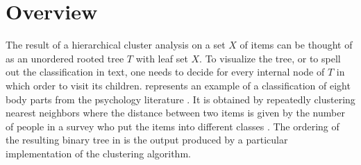 
%
%
%



\section{Overview}
\label{sec:overview}

The result of a hierarchical cluster analysis on a set $X$ of items can be thought of as an unordered rooted tree $T$ with leaf set $X$. To visualize the tree, or to spell out the classification in text, one needs to decide for every internal node of $T$ in which order to visit its children.  represents an example of a classification of eight body parts from the psychology literature \cite{Degerman1982}. It is obtained by repeatedly clustering nearest neighbors where the distance between two items is given by the number of people in a survey who put the items into different classes \cite{Miller1969}. The ordering of the resulting binary tree in  is the output produced by a particular implementation of the clustering algorithm.  %
%

